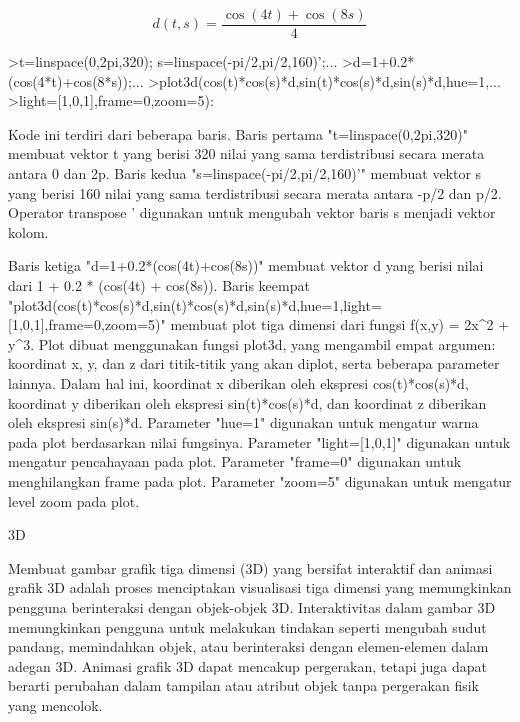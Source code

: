 \documentclass[a4paper,10pt]{article}
\begin{document}
\begin{eulernotebook}
\begin{eulercomment}
\begin{eulercomment}
\begin{eulercomment}
\begin{eulercomment}
\begin{eulercomment}
\begin{eulercomment}
\begin{eulercomment}
\begin{eulercomment}
\begin{eulercomment}
\end{eulercomment}
\begin{eulerformula}
\[
d(t,s) = \frac{\cos(4t)+\cos(8s)}{4}
\]
\end{eulerformula}
\begin{eulerprompt}
>t=linspace(0,2pi,320); s=linspace(-pi/2,pi/2,160)';...
>d=1+0.2*(cos(4*t)+cos(8*s));...
>plot3d(cos(t)*cos(s)*d,sin(t)*cos(s)*d,sin(s)*d,hue=1,...
>light=[1,0,1],frame=0,zoom=5):
\end{eulerprompt}
\begin{eulercomment}
Kode ini terdiri dari beberapa baris. Baris pertama
"t=linspace(0,2pi,320)" membuat vektor t yang berisi 320 nilai yang
sama terdistribusi secara merata antara 0 dan 2p. Baris kedua
"s=linspace(-pi/2,pi/2,160)'" membuat vektor s yang berisi 160 nilai
yang sama terdistribusi secara merata antara -p/2 dan p/2. Operator
transpose ' digunakan untuk mengubah vektor baris s menjadi vektor
kolom.

Baris ketiga "d=1+0.2*(cos(4t)+cos(8s))" membuat vektor d yang berisi
nilai dari 1 + 0.2 * (cos(4t) + cos(8s)). Baris keempat
"plot3d(cos(t)*cos(s)*d,sin(t)*cos(s)*d,sin(s)*d,hue=1,light=[1,0,1],frame=0,zoom=5)"
membuat plot tiga dimensi dari fungsi f(x,y) = 2x\textasciicircum{}2 + y\textasciicircum{}3. Plot dibuat
menggunakan fungsi plot3d, yang mengambil empat argumen: koordinat x,
y, dan z dari titik-titik yang akan diplot, serta beberapa parameter
lainnya. Dalam hal ini, koordinat x diberikan oleh ekspresi
cos(t)*cos(s)*d, koordinat y diberikan oleh ekspresi sin(t)*cos(s)*d,
dan koordinat z diberikan oleh ekspresi sin(s)*d. Parameter "hue=1"
digunakan untuk mengatur warna pada plot berdasarkan nilai fungsinya.
Parameter "light=[1,0,1]" digunakan untuk mengatur pencahayaan pada
plot. Parameter "frame=0" digunakan untuk menghilangkan frame pada
plot. Parameter "zoom=5" digunakan untuk mengatur level zoom pada
plot.
\end{eulercomment}
\begin{eulercomment}
3D
\end{eulercomment}
\begin{eulercomment}
Membuat gambar grafik tiga dimensi (3D) yang bersifat interaktif dan
animasi grafik 3D adalah proses menciptakan visualisasi tiga dimensi
yang memungkinkan pengguna berinteraksi dengan objek-objek 3D.
Interaktivitas dalam gambar 3D memungkinkan pengguna untuk melakukan
tindakan seperti mengubah sudut pandang, memindahkan objek, atau
berinteraksi dengan elemen-elemen dalam adegan 3D. Animasi grafik 3D
dapat mencakup pergerakan, tetapi juga dapat berarti perubahan dalam
tampilan atau atribut objek tanpa pergerakan fisik yang mencolok.


\end{eulercomment}
\end{eulercomment}
\end{eulercomment}
\end{eulercomment}
\end{eulercomment}
\end{eulercomment}
\end{eulercomment}
\end{eulercomment}
\end{eulercomment}
\end{eulernotebook}
\end{document}

